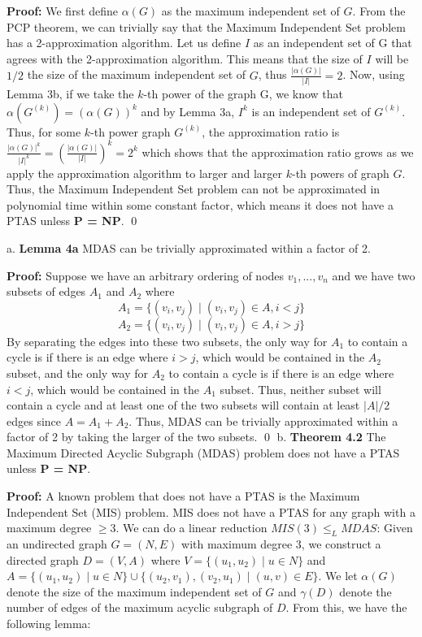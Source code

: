 \documentclass[oneside]{homework} %
\begin{document}
\textbf{Proof:} We first define $\alpha(G)$ as the maximum independent set of $G$. From the PCP theorem, we can trivially say that the Maximum Independent Set problem has a 2-approximation algorithm. Let us define $I$ as an independent set of G that agrees with the 2-approximation algorithm. This means that the size of $I$ will be $1/2$ the size of the maximum independent set of $G$, thus $\frac{|\alpha(G)|}{|I|} = 2$. Now, using Lemma 3b, if we take the $k$-th power of the graph G, we know that $\alpha(G^{(k)}) = (\alpha(G))^k$ and by Lemma 3a, $I^k$ is an independent set of $G^{(k)}$. Thus, for some $k$-th power graph $G^{(k)}$, the approximation ratio is $\frac{|\alpha(G)|^k}{|I|^k} = (\frac{|\alpha(G)|}{|I|})^k = 2^k$ which shows that the approximation ratio grows as we apply the approximation algorithm to larger and larger $k$-th powers of graph $G$. Thus, the Maximum Independent Set problem can not be approximated in polynomial time within some constant factor, which means it does not have a PTAS unless \textbf{P = NP}. \hfill\qed

{\large a.} \textbf{Lemma 4a} MDAS can be trivially approximated within a factor of 2.
\newline

\textbf{Proof:} Suppose we have an arbitrary ordering of nodes $v_1, ..., v_n$ and we have two subsets of edges $A_1$ and $A_2$ where $$A_1 = \{(v_i, v_j) \mid (v_i, v_j) \in A, i < j\}$$ $$A_2 = \{(v_i, v_j) \mid (v_i, v_j) \in A, i > j\}$$ By separating the edges into these two subsets, the only way for $A_1$ to contain a cycle is if there is an edge where $i > j$, which would be contained in the $A_2$ subset, and the only way for $A_2$ to contain a cycle is if there is an edge where $ i < j$, which would be contained in the $A_1$ subset. Thus, neither subset will contain a cycle and at least one of the two subsets will contain at least $|A|/2$ edges since $A = A_1 + A_2$. Thus, MDAS can be trivially approximated within a factor of 2 by taking the larger of the two subsets. \hfill\qed
\newline
\newline
{\large b.} \textbf{Theorem 4.2} The Maximum Directed Acyclic Subgraph (MDAS) problem does not have a PTAS unless \textbf{P = NP}.
\newline

\textbf{Proof:} A known problem that does not have a PTAS is the Maximum Independent Set (MIS) problem. MIS does not have a PTAS for any graph with a maximum degree $\geq 3$. We can do a linear reduction $MIS(3) \leq_L MDAS$: Given an undirected graph $G = (N, E)$ with maximum degree 3, we construct a directed graph $D = (V, A)$ where $V = \{(u_1, u_2) \mid u \in N\}$ and $A = \{(u_1, u_2) \mid u \in N\}  \cup \{(u_2, v_1),(v_2, u_1) \mid (u, v) \in E\}$. We let $\alpha(G)$ denote the size of the maximum independent set of $G$ and $\gamma(D)$ denote the number of edges of the maximum acyclic subgraph of $D$. From this, we have the following lemma:
\newline
\end{document}
